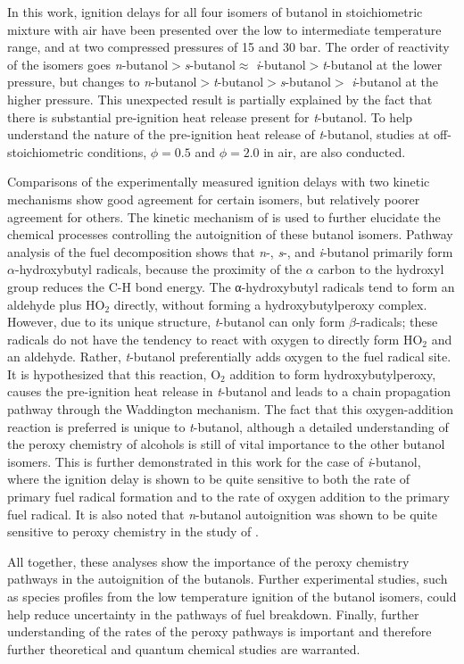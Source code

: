 \documentclass[12pt, letterpaper]{article}
\begin{document}
In this work, ignition delays for all four isomers of butanol in stoichiometric
mixture with air have been presented over the low to intermediate temperature
range, and at two compressed pressures of 15 and 30 bar. The order of
reactivity of the isomers goes \textit{n}-butanol$>$\textit{s}-butanol$\approx$
\textit{i}-butanol$>$\textit{t}-butanol at the lower pressure, but changes to
\textit{n}-butanol$>$\textit{t}-butanol$>$\textit{s}-butanol$>$
\textit{i}-butanol at the higher pressure. This unexpected result is partially
explained by the fact that there is substantial pre-ignition heat release
present for \textit{t}-butanol. To help understand the nature of the
pre-ignition heat release of \textit{t}-butanol, studies at off-stoichiometric
conditions, $\phi=0.5$ and $\phi=2.0$ in air, are also conducted.

Comparisons of the experimentally measured ignition delays with two kinetic
mechanisms show good agreement for certain isomers, but relatively poorer
agreement for others. The kinetic mechanism of \textcite{Sarathy2012} is used
to further elucidate the chemical processes controlling the autoignition of
these butanol isomers. Pathway analysis of the fuel decomposition shows that
\textit{n}-, \textit{s}-, and \textit{i}-butanol primarily form
$\alpha$-hydroxybutyl radicals, because the proximity of the $\alpha$ carbon to
the hydroxyl group reduces the C-H bond energy. The α-hydroxybutyl radicals
tend to form an aldehyde plus HO$_2$  directly, without forming a
hydroxybutylperoxy complex. However, due to its unique structure,
\textit{t}-butanol can only form $\beta$-radicals; these radicals do not have
the tendency to react with oxygen to directly form HO$_2$  and an aldehyde.
Rather, \textit{t}-butanol preferentially adds oxygen to the fuel radical site.
It is hypothesized that this reaction, O$_2$  addition to form
hydroxybutylperoxy, causes the pre-ignition heat release in \textit{t}-butanol
and leads to a chain propagation pathway through the Waddington mechanism. The
fact that this oxygen-addition reaction is preferred is unique to
\textit{t}-butanol, although a detailed understanding of the peroxy chemistry
of alcohols is still of vital importance to the other butanol isomers. This is
further demonstrated in this work for the case of \textit{i}-butanol, where the
ignition delay is shown to be quite sensitive to both the rate of primary fuel
radical formation and to the rate of oxygen addition to the primary fuel
radical. It is also noted that \textit{n}-butanol autoignition was shown to be
quite sensitive to peroxy chemistry in the study of \textcite{Vranckx2011}.

All together, these analyses show the importance of the peroxy chemistry
pathways in the autoignition of the butanols. Further experimental studies,
such as species profiles from the low temperature ignition of the butanol
isomers, could help reduce uncertainty in the pathways of fuel breakdown.
Finally, further understanding of the rates of the peroxy pathways is
important and therefore further theoretical and quantum chemical studies are
warranted.
\end{document}
